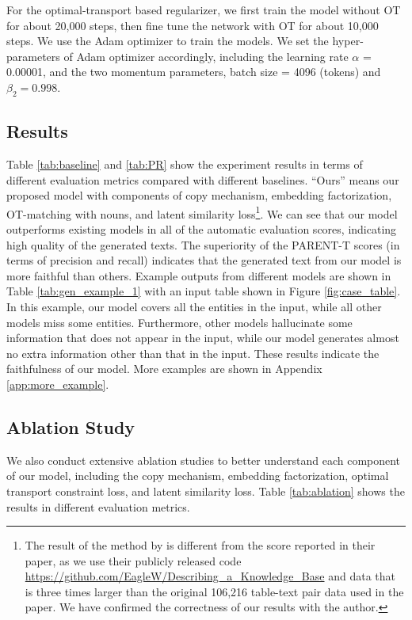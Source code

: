 \documentclass[11pt,a4paper]{article}
\newcommand{\quotes}[1]{``#1''}
\begin{document}
For the optimal-transport based regularizer, we first train the model without OT for about 20,000 steps, then fine tune the network with OT for about 10,000 steps. 
We use the Adam \cite{Kingma2015}
optimizer to train the models. We set the hyper-parameters of Adam optimizer accordingly, including the learning rate $\alpha$ = 0.00001, and the two momentum parameters, batch size = 4096 (tokens) and $\beta_2 = 0.998$.




\subsection{Results}
Table \ref{tab:baseline} and \ref{tab:PR} show the experiment results in terms of different evaluation metrics compared with different baselines. \quotes{Ours} means our proposed model with components of copy mechanism, embedding factorization, OT-matching with nouns, and latent similarity loss\footnote{The result of the method by \cite{Wang2018} is different from the score reported in their paper, as we use their publicly released code \href{url}{https://github.com/EagleW/Describing\_a\_Knowledge\_Base} and data that is three times larger than the original 106,216 table-text pair data used in the paper. We have confirmed the correctness of our results with the author.}. We can see that our model outperforms existing models in all of the automatic evaluation scores, indicating high quality of the generated texts. The superiority of the PARENT-T scores (in terms of precision and recall) indicates that the generated text from our model is more faithful than others. Example outputs from different models are shown in Table \ref{tab:gen_example_1} with an input table shown in Figure \ref{fig:case_table}. In this example, our model covers all the entities in the input, while all other models miss some entities. Furthermore, other models hallucinate some information that does not appear in the input, while our model generates almost no extra information other than that in the input. These results indicate the faithfulness of our model. More examples are shown in Appendix \ref{app:more_example}.


\subsection{Ablation Study}

We also conduct extensive ablation studies to better understand each component of our model, including the copy mechanism, embedding factorization, optimal transport constraint loss, and latent similarity loss. Table \ref{tab:ablation} shows the results in different evaluation metrics.
\end{document}
